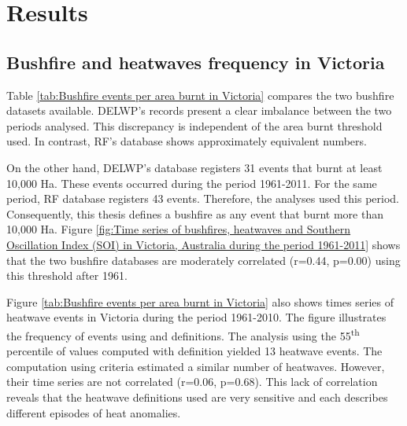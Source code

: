 \section{Results}


\subsection{Bushfire and heatwaves frequency in Victoria}

Table \ref{tab:Bushfire events per area burnt in Victoria} compares
the two bushfire datasets available. DELWP's records present a clear
imbalance between the two periods analysed. This discrepancy is
independent of the area burnt threshold used. In contrast, RF's database
shows approximately equivalent numbers.

On the other hand, DELWP's database registers 31 events that burnt
at least 10,000 Ha. These events occurred during the period 1961-2011.
For the same period, RF database registers 43 events. Therefore, the
analyses used this period. Consequently, this thesis defines a bushfire
as any event that burnt more than 10,000 Ha. Figure \ref{fig:Time series of bushfires, heatwaves and Southern Oscillation Index (SOI) in Victoria, Australia during the period 1961-2011}
shows that the two bushfire databases are moderately correlated (r=0.44,
p=0.00) using this threshold after 1961.

\begin{table}[h]
\caption[Bushfire events per area burnt in Victoria]{Bushfire events per area burnt in Victoria during the season December-January-February
(DJF). Data source: Department of Environment, Land, Water and Planning
(DELWP) and Risk Frontiers (RF). \label{tab:Bushfire events per area burnt in Victoria}}


\noindent \centering{}\noindent{}
\end{table}


Figure \ref{tab:Bushfire events per area burnt in Victoria} also
shows times series of heatwave events in Victoria during the period
1961-2010. The figure illustrates the frequency of events using \citet{Nairn2009}
and \citet{Pezza2012} definitions. The analysis using the 55\textsuperscript{th} percentile
of values computed with \citet{Nairn2009} definition yielded 13 heatwave
events. The computation using \citet{Pezza2012} criteria estimated
a similar number of heatwaves. However, their time series are not correlated (r=0.06, p=0.68).
This lack of correlation reveals that the heatwave definitions used are very sensitive and 
each describes different episodes of heat anomalies.  

